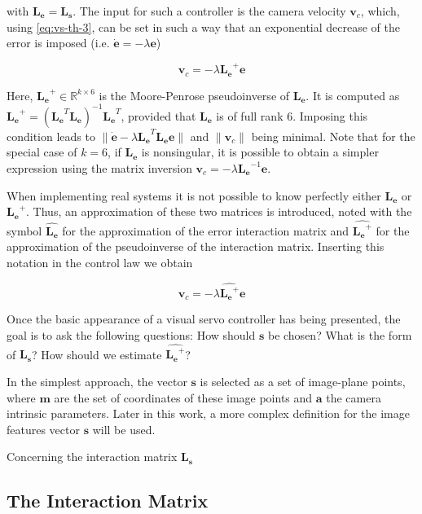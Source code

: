 with $\bm{L_e} = \bm{L_s}$. The input for such a controller is the camera velocity  $\bm{v}_c$, which, using \ref{eq:vs-th-3}, can be set in such a way that an exponential decrease of the error is imposed (i.e. $\dot{\bm{e}} = - \lambda \bm{e}$) 

\begin{equation}
\bm{v}_c = - \lambda \bm{L_e}^+ \bm{e}
\label{eq:vs-th-4}
\end{equation}

Here, $\bm{L_e}^+ \in \mathbb{R}^{k \times 6}$ is the Moore-Penrose pseudoinverse of $\bm{L_e}$. It is computed as $\bm{L_e}^+ = (\bm{L_e}^T \bm{L_e})^{-1} \bm{L_e}^T$, provided that $\bm{L_e}$ is of full rank 6. Imposing this condition leads to $\| \dot{\bm{e}} - \lambda \bm{L_e}^T \bm{L_e} \bm{e} \|$ and $\| \bm{v}_c \|$ being minimal. Note that for the special case of $k=6$, if $\bm{L_e}$ is nonsingular, it is possible to obtain a simpler expression using the matrix inversion $\bm{v}_c = - \lambda \bm{L_e}^{-1} \bm{e}$.

When implementing real systems it is not possible to know perfectly either $\bm{L_e}$ or $\bm{L_e}^{+}$. Thus, an approximation of these two matrices is introduced, noted with the symbol $\widehat{\bm{L_e}}$ for the approximation of the error interaction matrix and $\widehat{\bm{L_e}^+}$ for the approximation of the pseudoinverse of the interaction matrix. Inserting this notation in the control law we obtain

\begin{equation}
\bm{v}_c = - \lambda \widehat{\bm{L_e}^+} \bm{e}
\label{eq:vs-th-5}
\end{equation}

Once the basic appearance of a visual servo controller has being presented, the goal is to ask the following questions: How should $\bm{s}$ be chosen?  What is the form of $\bm{L_s}$? How should we estimate $\widehat{\bm{L_e}^+}$?

In the simplest approach, the vector $\bm{s}$ is selected as a set of image-plane points, where $\bm{m}$ are the set of coordinates of these  image points and $\bm{a}$ the camera intrinsic parameters. Later in this work, a more complex definition for the image features vector $\bm{s}$ will be used.

Concerning the interaction matrix $\bm{L_s}$ 

\subsection*{The Interaction Matrix}

